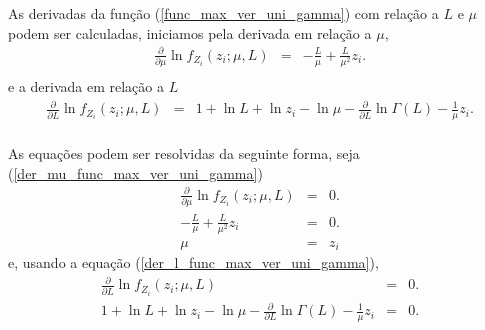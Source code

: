 \documentclass[journal,article,submit,moreauthors,pdftex]{Definitions/mdpi}
\begin{document}
As derivadas da função (\ref{func_max_ver_uni_gamma}) com relação a $L$ e $\mu$ podem ser calculadas, iniciamos pela derivada em relação a $\mu$,
\begin{equation}\label{der_mu_func_max_ver_uni_gamma}
\begin{array}{ccc}
	\frac{\partial}{\partial \mu}\ln f_{Z_{i}}(z_{i};\mu,L)&=& -\frac{L}{\mu} + \frac{L}{\mu^2} z_i.\\
\end{array}
\end{equation}
e a derivada em relação a $L$
\begin{equation}\label{der_l_func_max_ver_uni_gamma}
\begin{array}{ccc}
	\frac{\partial}{\partial L}\ln f_{Z_{i}}(z_{i};\mu,L)&=&1 + \ln L + \ln z_{i}-\ln \mu -\frac{\partial}{\partial L}\ln \Gamma(L)-\frac{1}{\mu} z_i.\\
\end{array}
\end{equation}

As equações podem ser resolvidas da seguinte forma, seja (\ref{der_mu_func_max_ver_uni_gamma}) 
\begin{equation}\label{der_mu_func_max_ver_uni_gamma_equal_to_zero}
\begin{array}{ccc}
\frac{\partial}{\partial \mu}\ln f_{Z_{i}}(z_{i};\mu,L)&=&0.\\
	 -\frac{L}{\mu} + \frac{L}{\mu^2} z_i&=&0.\\
	 \mu &=& z_i
\end{array}
\end{equation}
e, usando a equação (\ref{der_l_func_max_ver_uni_gamma}),
\begin{equation}\label{der_l_func_max_ver_uni_gamma_equal_to_zero}
\begin{array}{ccc}
	\frac{\partial}{\partial L}\ln f_{Z_{i}}(z_{i};\mu,L)&=&0.\\
	1 + \ln L + \ln z_{i}-\ln \mu -\frac{\partial}{\partial L}\ln \Gamma(L)-\frac{1}{\mu} z_i&=&0.\\
\end{array}
\end{equation}
\end{document}
